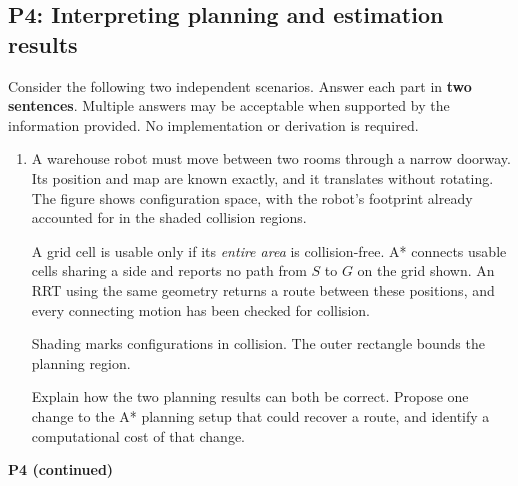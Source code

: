\documentclass[11pt]{article}
\newenvironment{studentanswer}[1]
  {\par\medskip\noindent
   \begin{tcolorbox}[height from=#1 to 100cm, colback=white, colframe=gray!60,
     boxrule=0.6pt, arc=0pt, outer arc=0pt, left=7pt, right=7pt,
     top=7pt, bottom=7pt, title={Answer / work}, fonttitle=\small,
     coltitle=black, colbacktitle=gray!8, titlerule=0pt]
   \ignorespaces}
  {\end{tcolorbox}\par}
\begin{document}
\subsection*{P4: Interpreting planning and estimation results}
Consider the following two independent scenarios. Answer each part in
\textbf{two sentences}. Multiple answers may be acceptable when supported
by the information provided. No implementation or derivation is required.
\begin{enumerate}[label=(\alph*)]
\item \begin{minipage}[t]{\linewidth} A warehouse robot must move between two rooms through a narrow
doorway. Its position and map are known exactly, and it translates without
rotating. The figure shows configuration space, with the robot's footprint
already accounted for in the shaded collision regions.

A grid cell is usable only if its \emph{entire area} is collision-free.
A* connects usable cells sharing a side and reports no path from $S$ to
$G$ on the grid shown. An RRT using the same geometry returns a route
between these positions, and every connecting motion has been checked
for collision.
\begin{center}

\small Shading marks configurations in collision.
The outer rectangle bounds the planning region.
\end{center}
Explain how the two planning results can both be correct. Propose one
change to the A* planning setup that could recover a route, and identify
a computational cost of that change.

\begin{studentanswer}{4cm}
\end{studentanswer}

\end{minipage}
\end{enumerate}
\clearpage
\noindent\textbf{P4 (continued)}
\end{document}
